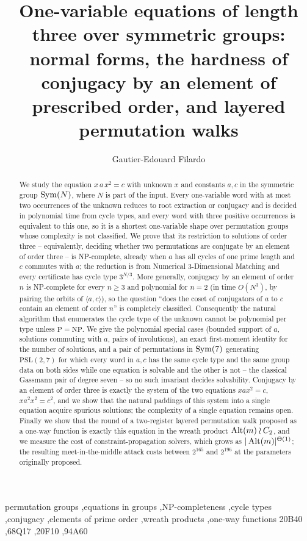 \documentclass[preprint,12pt]{elsarticle}
\theoremstyle{definition}\newtheorem{defi}[thm]{Definition}\newtheorem{prob}[thm]{Problem}\newtheorem{obs}[thm]{Observation}
\theoremstyle{remark}\newtheorem{rem}[thm]{Remark}
\begin{document}
\begin{frontmatter}
\title{One-variable equations of length three over symmetric groups: normal forms, the hardness of conjugacy by an element of prescribed order, and layered permutation walks}
\author[a]{Gautier-Edouard Filardo}
\begin{abstract}
We study the equation $x\,a\,x^{2}=c$ with unknown $x$ and constants $a,c$ in the symmetric group $\operatorname{Sym}(N)$, where $N$ is part of the input. Every one-variable word with at most two occurrences of the unknown reduces to root extraction or conjugacy and is decided in polynomial time from cycle types, and every word with three positive occurrences is equivalent to this one, so it is a shortest one-variable shape over permutation groups whose complexity is not classified. We prove that its restriction to solutions of order three -- equivalently, deciding whether two permutations are conjugate by an element of order three -- is NP-complete, already when $a$ has all cycles of one prime length and $c$ commutes with $a$; the reduction is from Numerical 3-Dimensional Matching and every certificate has cycle type $3^{N/3}$. More generally, conjugacy by an element of order $n$ is NP-complete for every $n\ge3$ and polynomial for $n=2$ (in time $O(N^{3})$, by pairing the orbits of $\langle a,c\rangle$), so the question ``does the coset of conjugators of $a$ to $c$ contain an element of order $n$'' is completely classified. Consequently the natural algorithm that enumerates the cycle type of the unknown cannot be polynomial per type unless $\mathrm P=\mathrm{NP}$. We give the polynomial special cases (bounded support of $a$, solutions commuting with $a$, pairs of involutions), an exact first-moment identity for the number of solutions, and a pair of permutations in $\operatorname{Sym}(7)$ generating $\mathrm{PSL}(2,7)$ for which every word in $a,c$ has the same cycle type and the same group data on both sides while one equation is solvable and the other is not -- the classical Gassmann pair of degree seven -- so no such invariant decides solvability. Conjugacy by an element of order three is exactly the system of the two equations $xax^{2}=c$, $xa^{2}x^{2}=c^{2}$, and we show that the natural paddings of this system into a single equation acquire spurious solutions; the complexity of a single equation remains open. Finally we show that the round of a two-register layered permutation walk proposed as a one-way function is exactly this equation in the wreath product $\operatorname{Alt}(m)\wr C_2$, and we measure the cost of constraint-propagation solvers, which grows as $|\operatorname{Alt}(m)|^{\Theta(1)}$; the resulting meet-in-the-middle attack costs between $2^{165}$ and $2^{196}$ at the parameters originally proposed. 
\end{abstract}
\begin{keyword}
permutation groups \sep equations in groups \sep NP-completeness \sep cycle types \sep conjugacy \sep elements of prime order \sep wreath products \sep one-way functions
\MSC[2020] 20B40 \sep 68Q17 \sep 20F10 \sep 94A60
\end{keyword}
\end{frontmatter}
\end{document}
